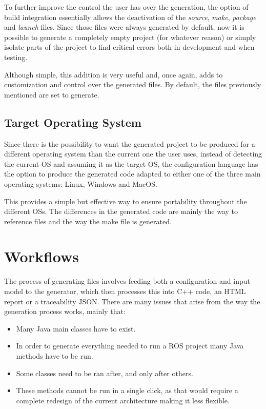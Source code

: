 To further improve the control the user has over the generation, the option of build integration essentially allows the deactivation of the \textit{source}, \textit{make}, \textit{package} and \textit{launch} files. Since those files were always generated by default, now it is possible to generate a completely empty project (for whatever reason) or simply isolate parts of the project to find critical errors both in development and when testing.

Although simple, this addition is very useful and, once again, adds to customization and control over the generated files. By default, the files previously mentioned are set to generate.


\subsection{Target Operating System}
\label{sec:impl_os}

Since there is the possibility to want the generated project to be produced for a different operating system than the current one the user uses, instead of detecting the current \gls{OS} and assuming it as the target \gls{OS}, the configuration language has the option to produce the generated code adapted to either one of the three main operating systems: Linux, Windows and MacOS.

This provides a simple but effective way to ensure portability throughout the different \glspl{OS}.
The differences in the generated code are mainly the way to reference files and the way the make file is generated. 






\section{Workflows}
\label{sec:workflows}

The process of generating files involves feeding both a configuration and input model to the generator, which then processes this into C++ code, an \gls{HTML} report or a traceability \gls{JSON}. There are many issues that arise from the way the generation process works, mainly that:

\begin{itemize} 
	\item Many Java main classes have to exist.
	\item In order to generate everything needed to run a \gls{ROS} project many Java methods have to be run.
	\item Some classes need to be ran after, and only after others.
	\item These methods cannot be run in a single click, as that would require a complete redesign of the current architecture making it less flexible.
\end{itemize}


